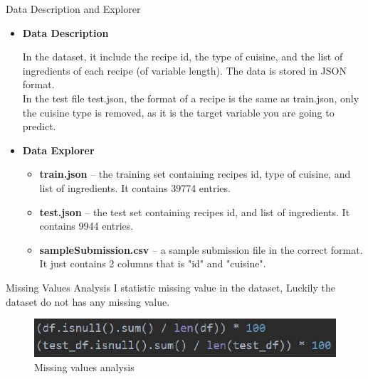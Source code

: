 \documentclass[
 size=14pt,
 paper=smartboard,  %
 mode=present, 		%
 display=slides, 	%
 style=tuliplab,  	%
 pauseslide,
 fleqn,leqno]{powerdot}
\begin{document}
\begin{slide}{Data Description and Explorer}

\begin{itemize}
	\item \textbf{Data Description}
	
	\medskip
	In the dataset, it include the recipe id, the type of cuisine, and the list of ingredients of each recipe (of variable length). The data is stored in JSON format.\\
	
	In the test file test.json, the format of a recipe is the same as train.json, only the cuisine type is removed, as it is the target variable you are going to predict.
	\bigskip
	\item \textbf{Data Explorer}
	
	\begin{itemize}
		\smallskip
		\item \textbf{train.json} -- the training set containing recipes id, type of cuisine, and list of ingredients. It contains 39774 entries.
		\smallskip
		\item \textbf{test.json} -- the test set containing recipes id, and list of ingredients. It contains 9944 entries.
		\item \textbf{sampleSubmission.csv} -- a sample submission file in the correct format. It just contains 2 columns that is "id" and "cuisine".
	\end{itemize}
	
\end{itemize}

\end{slide}

	

\begin{slide}{Missing Values Analysis}
I statistic missing value in the dataset, Luckily the dataset do not has any missing value.
\begin{figure}[htbp]
	\includegraphics[scale=1.5]{./figure1/1.eps}
	\caption{Missing values analysis}
\end{figure}
\end{slide}
\end{document}
